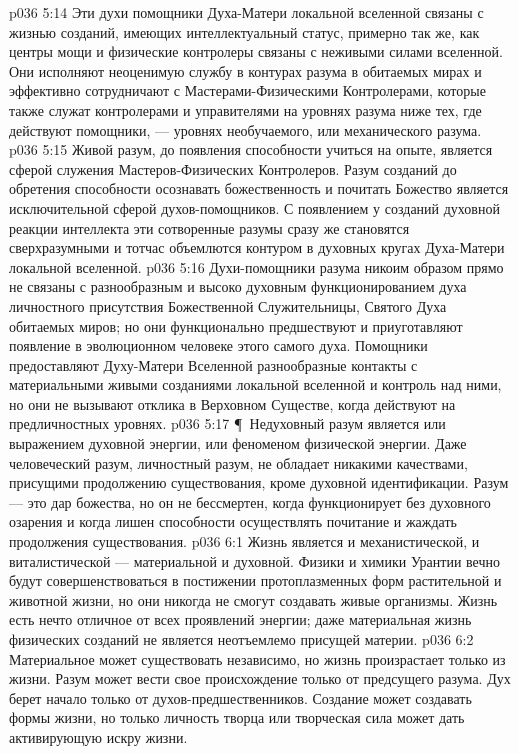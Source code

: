 \vs p036 5:14 Эти духи помощники Духа\hyp{}Матери локальной вселенной связаны с жизнью созданий, имеющих интеллектуальный статус, примерно так же, как центры мощи и физические контролеры связаны с неживыми силами вселенной. Они исполняют неоценимую службу в контурах разума в обитаемых мирах и эффективно сотрудничают с Мастерами\hyp{}Физическими Контролерами, которые также служат контролерами и управителями на уровнях разума ниже тех, где действуют помощники, --- уровнях необучаемого, или механического разума.
\vs p036 5:15 Живой разум, до появления способности учиться на опыте, является сферой служения Мастеров\hyp{}Физических Контролеров. Разум созданий до обретения способности осознавать божественность и почитать Божество является исключительной сферой духов\hyp{}помощников. С появлением у созданий духовной реакции интеллекта эти сотворенные разумы сразу же становятся сверхразумными и тотчас объемлются контуром в духовных кругах Духа\hyp{}Матери локальной вселенной.
\vs p036 5:16 Духи\hyp{}помощники разума никоим образом прямо не связаны с разнообразным и высоко духовным функционированием духа личностного присутствия Божественной Служительницы, Святого Духа обитаемых миров; но они функционально предшествуют и приуготавляют появление в эволюционном человеке этого самого духа. Помощники предоставляют Духу\hyp{}Матери Вселенной разнообразные контакты с материальными живыми созданиями локальной вселенной и контроль над ними, но они не вызывают отклика в Верховном Существе, когда действуют на предличностных уровнях.
\vs p036 5:17 \P\ Недуховный разум является или выражением духовной энергии, или феноменом физической энергии. Даже человеческий разум, личностный разум, не обладает никакими качествами, присущими продолжению существования, кроме духовной идентификации. Разум --- это дар божества, но он не бессмертен, когда функционирует без духовного озарения и когда лишен способности осуществлять почитание и жаждать продолжения существования.
\vs p036 6:1 Жизнь является и механистической, и виталистической --- материальной и духовной. Физики и химики Урантии вечно будут совершенствоваться в постижении протоплазменных форм растительной и животной жизни, но они никогда не смогут создавать живые организмы. Жизнь есть нечто отличное от всех проявлений энергии; даже материальная жизнь физических созданий не является неотъемлемо присущей материи.
\vs p036 6:2 Материальное может существовать независимо, но жизнь произрастает только из жизни. Разум может вести свое происхождение только от предсущего разума. Дух берет начало только от духов\hyp{}предшественников. Создание может создавать формы жизни, но только личность творца или творческая сила может дать активирующую искру жизни.
